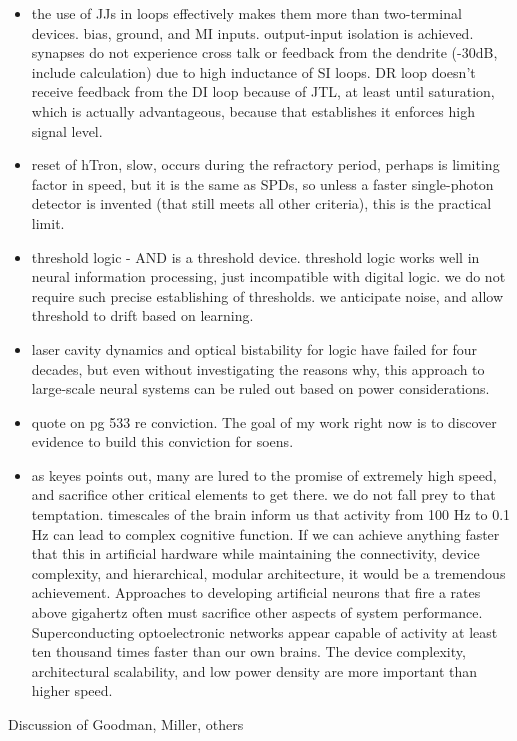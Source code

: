 \begin{itemize}
\item the use of JJs in loops effectively makes them more than two-terminal devices. bias, ground, and MI inputs. output-input isolation is achieved. synapses do not experience cross talk or feedback from the dendrite (-30dB, include calculation) due to high inductance of SI loops. DR loop doesn't receive feedback from the DI loop because of JTL, at least until saturation, which is actually advantageous, because that establishes it enforces high signal level.
\item reset of hTron, slow, occurs during the refractory period, perhaps is limiting factor in speed, but it is the same as SPDs, so unless a faster single-photon detector is invented (that still meets all other criteria), this is the practical limit.
\item threshold logic - AND is a threshold device. threshold logic works well in neural information processing, just incompatible with digital logic. we do not require such precise establishing of thresholds. we anticipate noise, and allow threshold to drift based on learning. 
\item laser cavity dynamics and optical bistability for logic have failed for four decades, but even without investigating the reasons why, this approach to large-scale neural systems can be ruled out based on power considerations. 
\item \cite{ke1985b} quote on pg 533 re conviction. The goal of my work right now is to discover evidence to build this conviction for soens.
\item as keyes points out, many are lured to the promise of extremely high speed, and sacrifice other critical elements to get there. we do not fall prey to that temptation. timescales of the brain inform us that activity from 100 Hz to 0.1 Hz can lead to complex cognitive function. If we can achieve anything faster that this in artificial hardware while maintaining the connectivity, device complexity, and hierarchical, modular architecture, it would be a tremendous achievement. Approaches to developing artificial neurons that fire a rates above gigahertz often must sacrifice other aspects of system performance. Superconducting optoelectronic networks appear capable of activity at least ten thousand times faster than our own brains. The device complexity, architectural scalability, and low power density are more important than higher speed. 
\end{itemize}

\vspace{3em}
Discussion of Goodman, Miller, others


